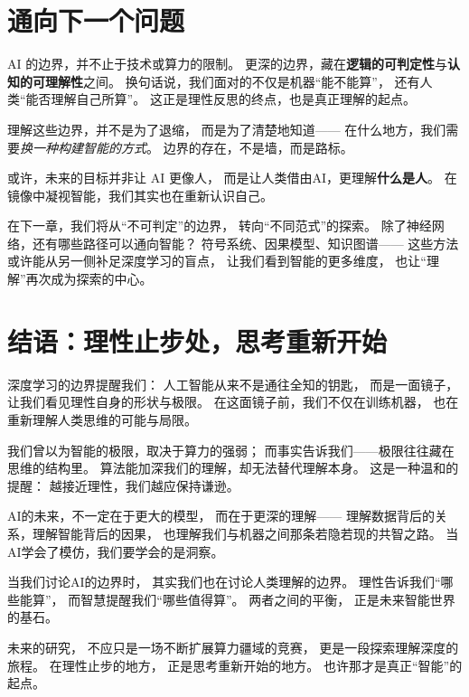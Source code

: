 

\section*{通向下一个问题}
 
AI 的边界，并不止于技术或算力的限制。  
更深的边界，藏在\textbf{逻辑的可判定性}与\textbf{认知的可理解性}之间。  
换句话说，我们面对的不仅是机器“能不能算”，  
还有人类“能否理解自己所算”。  
这正是理性反思的终点，也是真正理解的起点。

理解这些边界，并不是为了退缩，  
而是为了清楚地知道——  
在什么地方，我们需要\textit{换一种构建智能的方式}。  
边界的存在，不是墙，而是路标。  

或许，未来的目标并非让 AI 更像人，  
而是让人类借由AI，更理解\textbf{什么是人}。  
在镜像中凝视智能，我们其实也在重新认识自己。

在下一章，我们将从“不可判定”的边界，  
转向“不同范式”的探索。  
除了神经网络，还有哪些路径可以通向智能？  
符号系统、因果模型、知识图谱——  
这些方法或许能从另一侧补足深度学习的盲点，  
让我们看到智能的更多维度，  
也让“理解”再次成为探索的中心。

\section*{结语：理性止步处，思考重新开始}

深度学习的边界提醒我们：  
人工智能从来不是通往全知的钥匙，  
而是一面镜子，让我们看见理性自身的形状与极限。  
在这面镜子前，我们不仅在训练机器，  
也在重新理解人类思维的可能与局限。

我们曾以为智能的极限，取决于算力的强弱；  
而事实告诉我们——极限往往藏在思维的结构里。  
算法能加深我们的理解，却无法替代理解本身。  
这是一种温和的提醒：  
越接近理性，我们越应保持谦逊。

AI的未来，不一定在于更大的模型，  
而在于更深的理解——  
理解数据背后的关系，理解智能背后的因果，  
也理解我们与机器之间那条若隐若现的共智之路。  
当AI学会了模仿，我们要学会的是洞察。

当我们讨论AI的边界时，  
其实我们也在讨论人类理解的边界。  
理性告诉我们“哪些能算”，  
而智慧提醒我们“哪些值得算”。  
两者之间的平衡，  
正是未来智能世界的基石。

未来的研究，  
不应只是一场不断扩展算力疆域的竞赛，  
更是一段探索理解深度的旅程。  
在理性止步的地方，  
正是思考重新开始的地方。  
也许那才是真正“智能”的起点。

